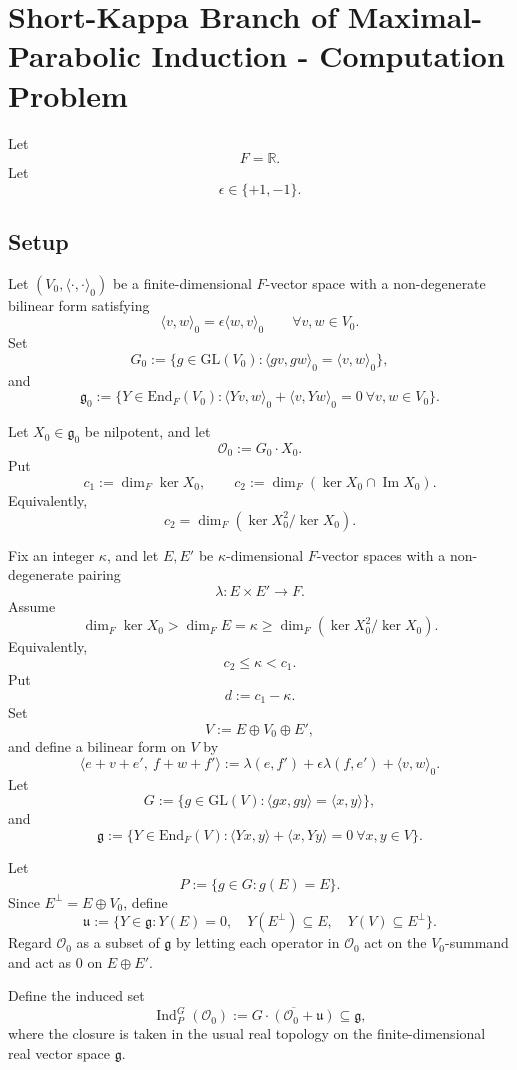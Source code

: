 \documentclass[
  11pt,
]{article}
\begin{document}
\section{Short-Kappa Branch of Maximal-Parabolic Induction - Computation
Problem}\label{short-kappa-branch-of-maximal-parabolic-induction---computation-problem}

Let \[
F=\mathbb R.
\] Let \[
\epsilon\in\{+1,-1\}.
\]

\subsection{Setup}\label{setup}

Let \((V_0,\langle\cdot,\cdot\rangle_0)\) be a finite-dimensional
\(F\)-vector space with a non-degenerate bilinear form satisfying \[
\langle v,w\rangle_0=\epsilon\langle w,v\rangle_0
\qquad \forall v,w\in V_0.
\] Set \[
G_0:=\{g\in \mathrm{GL}(V_0):\langle gv,gw\rangle_0=\langle v,w\rangle_0\},
\] and \[
\mathfrak g_0:=\{Y\in\mathrm{End}_F(V_0):
\langle Yv,w\rangle_0+\langle v,Yw\rangle_0=0\ \forall v,w\in V_0\}.
\]

Let \(X_0\in\mathfrak g_0\) be nilpotent, and let \[
\mathcal O_0:=G_0\cdot X_0.
\] Put \[
c_1:=\dim_F\ker X_0,
\qquad
c_2:=\dim_F(\ker X_0\cap\operatorname{Im}X_0).
\] Equivalently, \[
c_2=\dim_F(\ker X_0^2/\ker X_0).
\]

Fix an integer \(\kappa\), and let \(E,E'\) be \(\kappa\)-dimensional
\(F\)-vector spaces with a non-degenerate pairing \[
\lambda:E\times E'\to F.
\] Assume \[
\dim_F\ker X_0>\dim_F E=\kappa\ge \dim_F(\ker X_0^2/\ker X_0).
\] Equivalently, \[
c_2\le \kappa<c_1.
\] Put \[
d:=c_1-\kappa.
\] Set \[
V:=E\oplus V_0\oplus E',
\] and define a bilinear form on \(V\) by \[
\langle e+v+e',\ f+w+f'\rangle
:=\lambda(e,f')+\epsilon\lambda(f,e')+\langle v,w\rangle_0.
\] Let \[
G:=\{g\in\mathrm{GL}(V):\langle gx,gy\rangle=\langle x,y\rangle\},
\] and \[
\mathfrak g:=\{Y\in\mathrm{End}_F(V):
\langle Yx,y\rangle+\langle x,Yy\rangle=0\ \forall x,y\in V\}.
\]

Let \[
P:=\{g\in G:g(E)=E\}.
\] Since \(E^\perp=E\oplus V_0\), define \[
\mathfrak u:=\{Y\in\mathfrak g:
Y(E)=0,\quad
Y(E^\perp)\subseteq E,\quad
Y(V)\subseteq E^\perp
\}.
\] Regard \(\mathcal O_0\) as a subset of \(\mathfrak g\) by letting
each operator in \(\mathcal O_0\) act on the \(V_0\)-summand and act as
\(0\) on \(E\oplus E'\).

Define the induced set \[
\operatorname{Ind}_P^G(\mathcal O_0)
:=\overline{G\cdot(\mathcal O_0+\mathfrak u)}\subseteq\mathfrak g,
\] where the closure is taken in the usual real topology on the
finite-dimensional real vector space \(\mathfrak g\).
\end{document}
